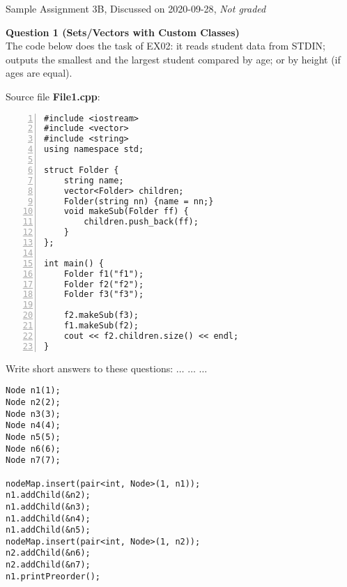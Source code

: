 \documentclass[11pt]{article}
\begin{document}
\thispagestyle{empty}

\twocolumn


\begin{center}
{\Large Sample Assignment 3B, Discussed on 2020-09-28},
{\em Not graded}
\end{center}

\vspace{10pt}
{\bf Question 1 (Sets/Vectors with Custom Classes)}\\
The code below does the task of EX02: it reads student data from STDIN;
outputs the smallest and the largest student compared by age; 
or by height (if ages are equal). 


\vspace{10pt}
Source file {\bf File1.cpp}:
{\footnotesize
\begin{center}
\begin{minipage}{.85\columnwidth}
\begin{Verbatim}[frame=single,numbers=left]
#include <iostream>
#include <vector>
#include <string>
using namespace std;

struct Folder {
    string name;
    vector<Folder> children;
    Folder(string nn) {name = nn;}
    void makeSub(Folder ff) {
        children.push_back(ff);
    }
};

int main() {    
    Folder f1("f1");
    Folder f2("f2");
    Folder f3("f3"); 

    f2.makeSub(f3);
    f1.makeSub(f2);
    cout << f2.children.size() << endl;
}
\end{Verbatim}
\end{minipage}
\end{center}
}

Write short answers to these questions: $\ldots$ $\ldots$ $\ldots$ 





\begin{verbatim}
Node n1(1);
Node n2(2);
Node n3(3);
Node n4(4);
Node n5(5);
Node n6(6);
Node n7(7);
    
nodeMap.insert(pair<int, Node>(1, n1));
n1.addChild(&n2);
n1.addChild(&n3);
n1.addChild(&n4);
n1.addChild(&n5);
nodeMap.insert(pair<int, Node>(1, n2));
n2.addChild(&n6);
n2.addChild(&n7);
n1.printPreorder();
\end{verbatim}
\end{document}
